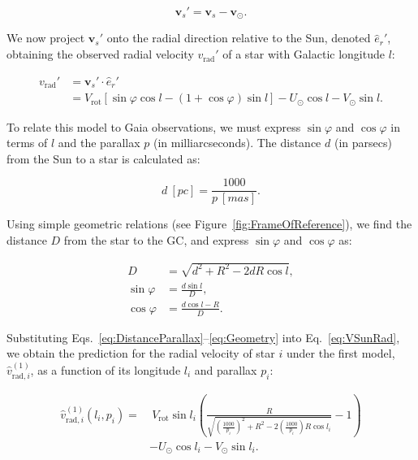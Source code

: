 \begin{equation}\label{eq:ReferenceFrame}
    \bm{v}_s' = \bm{v}_s - \bm{v}_{\odot}.
\end{equation}

We now project $\bm{v}_s'$ onto the radial direction relative to the Sun, denoted $\hat{e}_r'$, obtaining the observed radial velocity $v_{\text{rad}}'$ of a star with Galactic longitude $l$:

\begin{equation}\label{eq:VSunRad}
    \begin{aligned}
        v_{\text{rad}}' &= \bm{v}_s' \cdot \hat{e}_r' \\
        &= V_{\text{rot}} \left[ \sin\varphi \cos l - (1 + \cos\varphi)\sin l \right] - U_{\odot} \cos l - V_{\odot} \sin l.
    \end{aligned}
\end{equation}

To relate this model to Gaia observations, we must express $\sin\varphi$ and $\cos\varphi$ in terms of $l$ and the parallax $p$ (in milliarcseconds). The distance $d$ (in parsecs) from the Sun to a star is calculated as:

\begin{equation}\label{eq:DistanceParallax}
    d~[\unit{pc}] = \frac{1000}{p~[\unit{mas}]}.
\end{equation}

Using simple geometric relations (see Figure~\ref{fig:FrameOfReference}), we find the distance $D$ from the star to the GC, and express $\sin\varphi$ and $\cos\varphi$ as:

\begin{equation}\label{eq:Geometry}
    \begin{aligned}
        D &= \sqrt{d^2 + R^2 - 2dR \cos l}, \\
        \sin\varphi &= \frac{d \sin l}{D}, \\
        \cos\varphi &= \frac{d \cos l - R}{D}.
    \end{aligned}
\end{equation}

Substituting Eqs.~\ref{eq:DistanceParallax}--\ref{eq:Geometry} into Eq.~\ref{eq:VSunRad}, we obtain the prediction for the radial velocity of star $i$ under the first model, $\hat{v}_{\text{rad},i}^{(1)}$, as a function of its longitude $l_i$ and parallax $p_i$:

\begin{equation}\label{eq:VradModel1}
    \begin{aligned}
        \hat{v}_{\text{rad},i}^{(1)}(l_i, p_i) = &~V_{\text{rot}} \sin l_i \left( \frac{R}{\sqrt{\left(\frac{1000}{p_i}\right)^2 + R^2 - 2 \left(\frac{1000}{p_i}\right) R \cos l_i}} - 1 \right) \\
        &- U_{\odot} \cos l_i - V_{\odot} \sin l_i.
    \end{aligned}
\end{equation}

